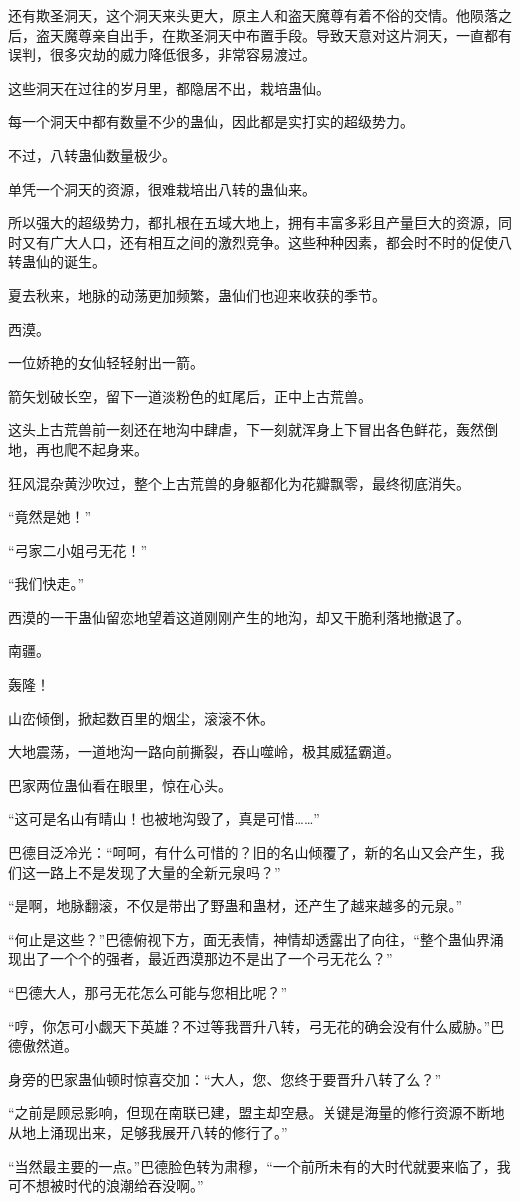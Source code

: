 \begin{this_body}
还有欺圣洞天，这个洞天来头更大，原主人和盗天魔尊有着不俗的交情。他陨落之后，盗天魔尊亲自出手，在欺圣洞天中布置手段。导致天意对这片洞天，一直都有误判，很多灾劫的威力降低很多，非常容易渡过。

这些洞天在过往的岁月里，都隐居不出，栽培蛊仙。

每一个洞天中都有数量不少的蛊仙，因此都是实打实的超级势力。

不过，八转蛊仙数量极少。

单凭一个洞天的资源，很难栽培出八转的蛊仙来。

所以强大的超级势力，都扎根在五域大地上，拥有丰富多彩且产量巨大的资源，同时又有广大人口，还有相互之间的激烈竞争。这些种种因素，都会时不时的促使八转蛊仙的诞生。

夏去秋来，地脉的动荡更加频繁，蛊仙们也迎来收获的季节。

西漠。

一位娇艳的女仙轻轻射出一箭。

箭矢划破长空，留下一道淡粉色的虹尾后，正中上古荒兽。

这头上古荒兽前一刻还在地沟中肆虐，下一刻就浑身上下冒出各色鲜花，轰然倒地，再也爬不起身来。

狂风混杂黄沙吹过，整个上古荒兽的身躯都化为花瓣飘零，最终彻底消失。

“竟然是她！”

“弓家二小姐弓无花！”

“我们快走。”

西漠的一干蛊仙留恋地望着这道刚刚产生的地沟，却又干脆利落地撤退了。

南疆。

轰隆！

山峦倾倒，掀起数百里的烟尘，滚滚不休。

大地震荡，一道地沟一路向前撕裂，吞山噬岭，极其威猛霸道。

巴家两位蛊仙看在眼里，惊在心头。

“这可是名山有晴山！也被地沟毁了，真是可惜……”

巴德目泛冷光：“呵呵，有什么可惜的？旧的名山倾覆了，新的名山又会产生，我们这一路上不是发现了大量的全新元泉吗？”

“是啊，地脉翻滚，不仅是带出了野蛊和蛊材，还产生了越来越多的元泉。”

“何止是这些？”巴德俯视下方，面无表情，神情却透露出了向往，“整个蛊仙界涌现出了一个个的强者，最近西漠那边不是出了一个弓无花么？”

“巴德大人，那弓无花怎么可能与您相比呢？”

“哼，你怎可小觑天下英雄？不过等我晋升八转，弓无花的确会没有什么威胁。”巴德傲然道。

身旁的巴家蛊仙顿时惊喜交加：“大人，您、您终于要晋升八转了么？”

“之前是顾忌影响，但现在南联已建，盟主却空悬。关键是海量的修行资源不断地从地上涌现出来，足够我展开八转的修行了。”

“当然最主要的一点。”巴德脸色转为肃穆，“一个前所未有的大时代就要来临了，我可不想被时代的浪潮给吞没啊。”

\end{this_body}

